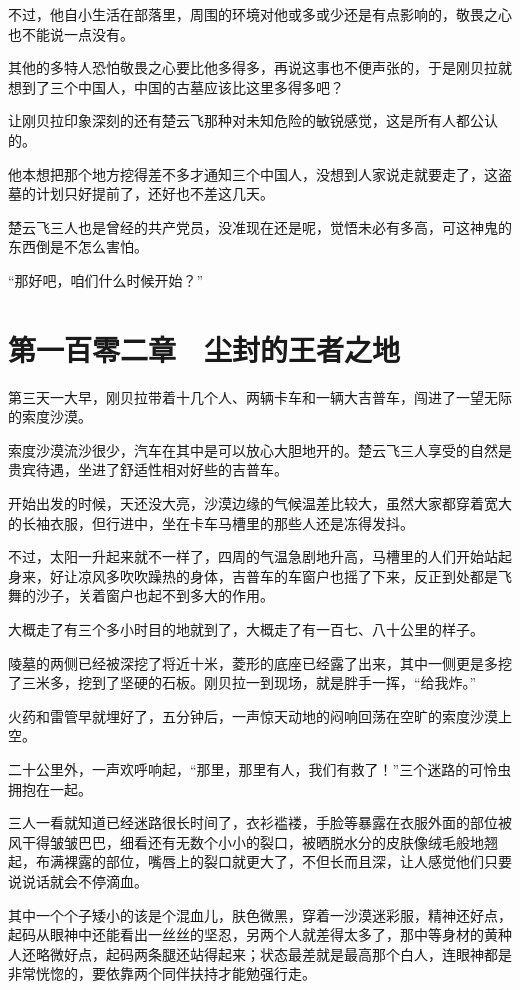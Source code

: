 不过，他自小生活在部落里，周围的环境对他或多或少还是有点影响的，敬畏之心也不能说一点没有。

其他的多特人恐怕敬畏之心要比他多得多，再说这事也不便声张的，于是刚贝拉就想到了三个中国人，中国的古墓应该比这里多得多吧？

让刚贝拉印象深刻的还有楚云飞那种对未知危险的敏锐感觉，这是所有人都公认的。

他本想把那个地方挖得差不多才通知三个中国人，没想到人家说走就要走了，这盗墓的计划只好提前了，还好也不差这几天。

楚云飞三人也是曾经的共产党员，没准现在还是呢，觉悟未必有多高，可这神鬼的东西倒是不怎么害怕。

“那好吧，咱们什么时候开始？”

\section{第一百零二章　尘封的王者之地}

第三天一大早，刚贝拉带着十几个人、两辆卡车和一辆大吉普车，闯进了一望无际的索度沙漠。

索度沙漠流沙很少，汽车在其中是可以放心大胆地开的。楚云飞三人享受的自然是贵宾待遇，坐进了舒适性相对好些的吉普车。

开始出发的时候，天还没大亮，沙漠边缘的气候温差比较大，虽然大家都穿着宽大的长袖衣服，但行进中，坐在卡车马槽里的那些人还是冻得发抖。

不过，太阳一升起来就不一样了，四周的气温急剧地升高，马槽里的人们开始站起身来，好让凉风多吹吹躁热的身体，吉普车的车窗户也摇了下来，反正到处都是飞舞的沙子，关着窗户也起不到多大的作用。

大概走了有三个多小时目的地就到了，大概走了有一百七、八十公里的样子。

陵墓的两侧已经被深挖了将近十米，菱形的底座已经露了出来，其中一侧更是多挖了三米多，挖到了坚硬的石板。刚贝拉一到现场，就是胖手一挥，“给我炸。”

火药和雷管早就埋好了，五分钟后，一声惊天动地的闷响回荡在空旷的索度沙漠上空。

二十公里外，一声欢呼响起，“那里，那里有人，我们有救了！”三个迷路的可怜虫拥抱在一起。

三人一看就知道已经迷路很长时间了，衣衫褴褛，手脸等暴露在衣服外面的部位被风干得皱皱巴巴，细看还有无数个小小的裂口，被晒脱水分的皮肤像绒毛般地翘起，布满裸露的部位，嘴唇上的裂口就更大了，不但长而且深，让人感觉他们只要说说话就会不停滴血。

其中一个个子矮小的该是个混血儿，肤色微黑，穿着一沙漠迷彩服，精神还好点，起码从眼神中还能看出一丝丝的坚忍，另两个人就差得太多了，那中等身材的黄种人还略微好点，起码两条腿还站得起来；状态最差就是最高那个白人，连眼神都是非常恍惚的，要依靠两个同伴扶持才能勉强行走。

